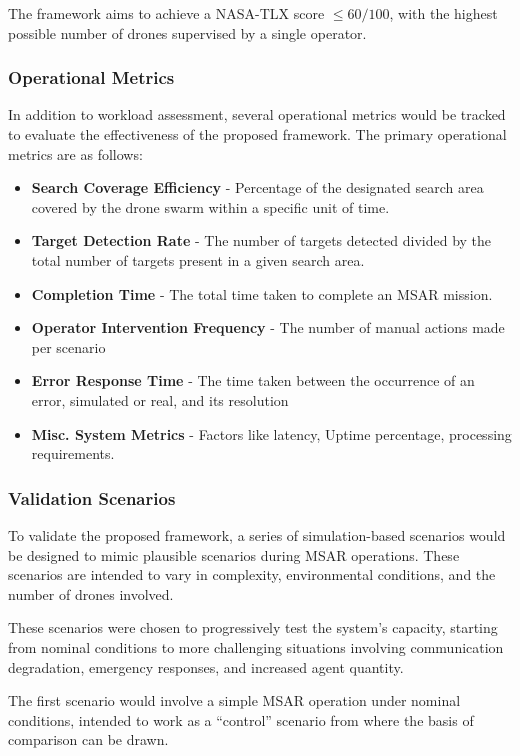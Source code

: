 The framework aims to achieve a NASA-TLX score $\leq 60/100$, with the highest possible number of drones supervised by a single operator.

\subsubsection{Operational Metrics}\label{subsubsec:operational-metrics}
In addition to workload assessment, several operational metrics would be tracked to evaluate the effectiveness of the proposed framework.
The primary operational metrics are as follows:

\begin{itemize}
    \item \textbf{Search Coverage Efficiency} - Percentage of the designated search area covered by the drone swarm within a specific unit of time.
    \item \textbf{Target Detection Rate} - The number of targets detected divided by the total number of targets present in a given search area.
    \item \textbf{Completion Time} - The total time taken to complete an MSAR mission.
    \item \textbf{Operator Intervention Frequency} - The number of manual actions made per scenario
    \item \textbf{Error Response Time} - The time taken between the occurrence of an error, simulated or real, and its resolution
    \item \textbf{Misc. System Metrics} - Factors like latency, Uptime percentage, processing requirements.
\end{itemize}

\subsubsection{Validation Scenarios}\label{subsubsec:validation-scenarios}
To validate the proposed framework, a series of simulation-based scenarios would be designed to mimic plausible scenarios during MSAR operations.
These scenarios are intended to vary in complexity, environmental conditions, and the number of drones involved.

These scenarios were chosen to progressively test the system's capacity, starting from nominal conditions to more challenging situations involving communication degradation, emergency responses, and increased agent quantity.

The first scenario would involve a simple MSAR operation under nominal conditions, intended to work as a ``control'' scenario from where the basis of comparison can be drawn.

